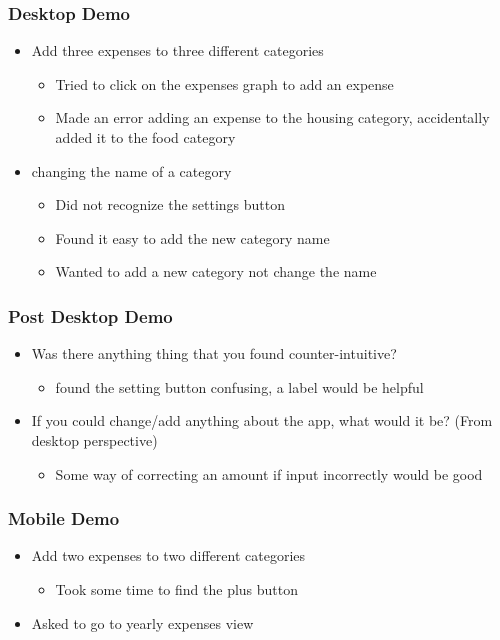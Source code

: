 \documentclass{chi2011}
\begin{document}
	\subsubsection{Desktop Demo}
	\begin{itemize}[noitemsep] 
		\item Add three expenses to three different categories
		\begin{itemize}[noitemsep]
				\item Tried to click on the expenses graph to add an expense
				\item Made an error adding an expense to the housing category,
					accidentally added it to the food category
		\end{itemize}
		\item changing the name of a category
			\begin{itemize}[noitemsep]
				\item Did not recognize the settings button
				\item Found it easy to add the new category name
				\item Wanted to add a new category not change the name
            \end{itemize}
	\end{itemize}
	
	\subsubsection{Post Desktop Demo}
	\begin{itemize}[noitemsep]
		\item Was there anything thing that you found counter-intuitive?
		\begin{itemize}[noitemsep]
				\item found the setting button confusing, a label would be
					helpful
		\end{itemize}
		\item If you could change/add anything about the app, what would it be? (From desktop perspective)
		\begin{itemize}[noitemsep]
				\item Some way of correcting an amount if input incorrectly
					would be good
		\end{itemize}
	\end{itemize}
	
	
	\subsubsection{Mobile Demo}
	\begin{itemize}[noitemsep] 
		\item Add two expenses to two different categories
		\begin{itemize}[noitemsep]
				\item Took some time to find the plus button
		\end{itemize}
	\item Asked to go to yearly expenses view
	\end{itemize}
\end{document}
